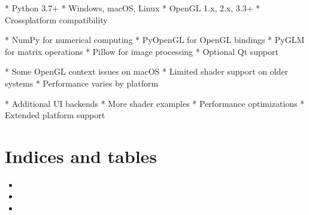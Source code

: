 \documentclass[a4paper,10pt,english,openany,oneside]{sphinxmanual}
\begin{document}
\sphinxAtStartPar
{}
* Python 3.7+
* Windows, macOS, Linux
* OpenGL 1.x, 2.x, 3.3+
* Cross\sphinxhyphen{}platform compatibility

\sphinxAtStartPar
{}
* NumPy for numerical computing
* PyOpenGL for OpenGL bindings
* PyGLM for matrix operations
* Pillow for image processing
* Optional Qt support

\sphinxAtStartPar
{}
* Some OpenGL context issues on macOS
* Limited shader support on older systems
* Performance varies by platform

\sphinxAtStartPar
{}
* Additional UI backends
* More shader examples
* Performance optimizations
* Extended platform support


\chapter{Indices and tables}
\label{\detokenize{index:indices-and-tables}}\begin{itemize}
\item {} 
\sphinxAtStartPar
{}

\item {} 
\sphinxAtStartPar
{}

\item {} 
\sphinxAtStartPar
{}

\end{itemize}



\renewcommand{\indexname}{Index}
\printindex
\end{document}
